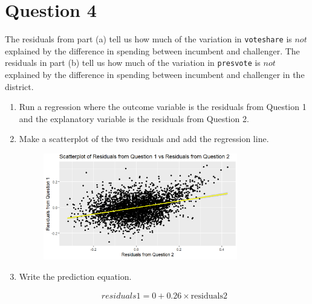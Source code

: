 \documentclass[12pt,letterpaper]{article}
\begin{document}
\section*{Question 4}
\noindent The residuals from part (a) tell us how much of the variation in \texttt{voteshare} is $not$ explained by the difference in spending between incumbent and challenger. The residuals in part (b) tell us how much of the variation in \texttt{presvote} is $not$ explained by the difference in spending between incumbent and challenger in the district.
	\begin{enumerate}
		\item Run a regression where the outcome variable is the residuals from Question 1 and the explanatory variable is the residuals from Question 2.		
		\item Make a scatterplot of the two residuals and add the regression line. 	
		\begin{figure}[h]
			\centering
			\includegraphics[width=0.8\textwidth]{Question4.png}
		\end{figure}		\vspace{3cm}
		\item Write the prediction equation.
			
			\begin{align*}
				residuals1 = 0 + 0.26 \times \text{residuals2}
			\end{align*}
	\end{enumerate}
	
\end{document}
